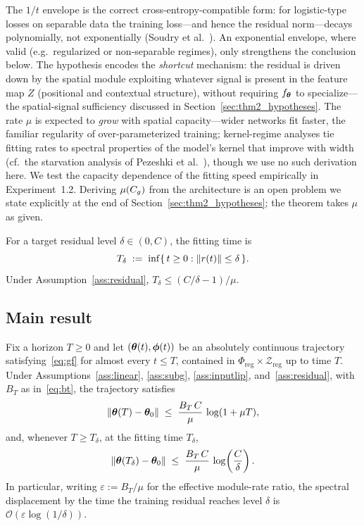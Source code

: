 \begin{remark}
\label{rem:residual_motivation}
The $1/t$ envelope is the correct cross-entropy-compatible form: for
logistic-type losses on separable data the training loss---and hence
the residual norm---decays polynomially, not exponentially
(Soudry et al.~\cite{soudry2018implicit}). An exponential envelope,
where valid (e.g.\ regularized or non-separable regimes), only
strengthens the conclusion below. The hypothesis encodes the
\emph{shortcut} mechanism: the residual is driven down by the spatial
module exploiting whatever signal is present in the feature map $Z$
(positional and contextual structure), without requiring $f_{\boldsymbol{\theta}}$
to specialize---the spatial-signal sufficiency discussed in
Section~\ref{sec:thm2_hypotheses}. The rate $\mu$ is expected to
\emph{grow} with spatial capacity---wider networks fit faster, the
familiar regularity of over-parameterized training; kernel-regime
analyses tie fitting rates to spectral properties of the model's
kernel that improve with width (cf.\ the starvation analysis of
Pezeshki et al.~\cite{pezeshki2021gradient}), though we use no such
derivation here. We test the capacity dependence of the fitting
speed empirically in Experiment~1.2. Deriving $\mu(C_g)$ from the
architecture is an open problem we state explicitly at the end of
Section~\ref{sec:thm2_hypotheses}; the theorem takes $\mu$ as
given.
\end{remark}

\begin{definition}
\label{def:fitting_time}
For a target residual level $\delta \in (0, C)$, the fitting time is
\[
    T_\delta \;:=\; \inf\{\, t \geq 0 : \left\lVert r(t)\right\rVert \leq \delta \,\}.
\]
Under Assumption~\ref{ass:residual}, $T_\delta \leq (C/\delta - 1)/\mu$.
\end{definition}

\subsection{Main result}

\begin{theorem}
\label{thm:twoscale}
Fix a horizon $T \geq 0$ and let $({\boldsymbol{\theta}}(t), {\boldsymbol{\phi}}(t))$ be an
absolutely continuous trajectory satisfying~\eqref{eq:gf} for almost
every $t \leq T$, contained in $\Phi_{\mathrm{reg}} \times
\mathcal{Z}_{\mathrm{reg}}$ up to time $T$. Under
Assumptions~\ref{ass:linear}, \ref{ass:subg}, \ref{ass:inputlip},
and~\ref{ass:residual}, with $B_T$ as in~\eqref{eq:bt}, the
trajectory satisfies
\[
    \left\lVert{\boldsymbol{\theta}}(T) - {\boldsymbol{\theta}}_0\right\rVert
    \;\leq\; \frac{B_T\,C}{\mu} \, \log(1 + \mu T),
\]
and, whenever $T \geq T_\delta$, at the fitting time $T_\delta$,
\[
    \left\lVert{\boldsymbol{\theta}}(T_\delta) - {\boldsymbol{\theta}}_0\right\rVert
    \;\leq\; \frac{B_T\,C}{\mu} \, \log\!\left(\frac{C}{\delta}\right).
\]
In particular, writing $\varepsilon := B_T/\mu$ for the effective
module-rate ratio, the spectral displacement by the time the training
residual reaches level $\delta$ is
$\mathcal{O}\!\left(\varepsilon \log(1/\delta)\right)$.
\end{theorem}

